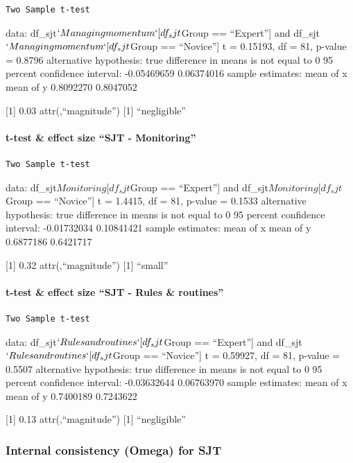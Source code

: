 \documentclass[
]{article}
\begin{document}
\begin{verbatim}
Two Sample t-test
\end{verbatim}

data: df\_sjt\(`Managing momentum`[df_sjt\)Group == ``Expert''{]} and
df\_sjt\(`Managing momentum`[df_sjt\)Group == ``Novice''{]} t = 0.15193,
df = 81, p-value = 0.8796 alternative hypothesis: true difference in
means is not equal to 0 95 percent confidence interval: -0.05469659
0.06374016 sample estimates: mean of x mean of y 0.8092270 0.8047052

{[}1{]} 0.03 attr(,``magnitude'') {[}1{]} ``negligible''

\paragraph{t-test \& effect size ``SJT -
Monitoring''}\label{t-test-effect-size-sjt---monitoring}

\begin{verbatim}
Two Sample t-test
\end{verbatim}

data: df\_sjt\(Monitoring[df_sjt\)Group == ``Expert''{]} and
df\_sjt\(Monitoring[df_sjt\)Group == ``Novice''{]} t = 1.4415, df = 81,
p-value = 0.1533 alternative hypothesis: true difference in means is not
equal to 0 95 percent confidence interval: -0.01732034 0.10841421 sample
estimates: mean of x mean of y 0.6877186 0.6421717

{[}1{]} 0.32 attr(,``magnitude'') {[}1{]} ``small''

\paragraph{t-test \& effect size ``SJT - Rules \&
routines''}\label{t-test-effect-size-sjt---rules-routines}

\begin{verbatim}
Two Sample t-test
\end{verbatim}

data: df\_sjt\(`Rules and routines`[df_sjt\)Group == ``Expert''{]} and
df\_sjt\(`Rules and routines`[df_sjt\)Group == ``Novice''{]} t =
0.59927, df = 81, p-value = 0.5507 alternative hypothesis: true
difference in means is not equal to 0 95 percent confidence interval:
-0.03632644 0.06763970 sample estimates: mean of x mean of y 0.7400189
0.7243622

{[}1{]} 0.13 attr(,``magnitude'') {[}1{]} ``negligible''

\subsubsection{Internal consistency (Omega) for
SJT}\label{internal-consistency-omega-for-sjt}
\end{document}
